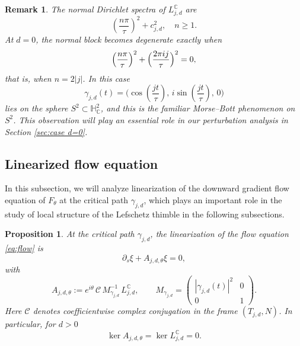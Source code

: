 \documentclass[11pt]{amsart}
\theoremstyle{plain}
\newtheorem{prop}[thm]{Proposition}
\newtheorem{rmk}[thm]{Remark}
\theoremstyle{definition}
\newcommand{\C}{\mathbb{C}}
\newcommand{\HH}{\mathbb{H}}
\begin{document}
\begin{rmk}
The normal Dirichlet spectra of $L_{j,d}^{\C}$ are
\[\left(\frac{n\pi}{\tau}\right)^2+c_{j,d}^2,\quad n\ge1.\]
At $d=0$, the normal block becomes degenerate exactly when
\[
\Bigl(\frac{n\pi}{\tau}\Bigr)^2+\Bigl(\frac{2\pi ij}{\tau}\Bigr)^2=0,
\]
that is, when $n=2|j|$. In this case 
$$
\gamma_{j,d}(t)=\bigl(\cos(\frac{jt}{\tau}),\,i \sin(\frac{jt}{\tau}),\,0\bigr)
$$
lies on the sphere $S^2\subset \HH_{\C}^2$, and this is the familiar Morse--Bott phenomenon on $S^2$. This observation will play an essential role in our perturbation analysis in Section \ref{sec:case d=0}. 
\end{rmk}





\subsection{Linearized flow equation}

In this subsection, we will analyze linearization of the downward gradient flow equation of $F_{\theta}$ at the critical path $\gamma_{j,d}$, which plays an important role in the study of local structure of the Lefschetz thimble in the following subsections. 

\begin{prop}\label{prop:linearization}
At the critical path $\gamma_{j,d}$, the linearization of the flow equation \eqref{eq:flow} is
\begin{equation}\label{eq:linflow}
\partial_s \xi + A_{j,d,\theta}\xi=0,
\end{equation}
with
\[
A_{j,d,\theta}:=e^{i\theta}\,\mathcal{C}\,M_{\gamma_{j,d}}^{-1}\,L_{j,d}^{\C},\qquad M_{\gamma_{j,d}}=\begin{pmatrix}
    |\gamma_{j,d}(t)|^2  & 0\\
    0 & 1
\end{pmatrix}.\]
Here $\mathcal C$ denotes coefficientwise complex conjugation in the frame $(T_{j,d},N)$. In particular, for $d>0$
\[
\ker A_{j,d,\theta}=\ker L_{j,d}^{\C}=0.
\]
\end{prop}
\end{document}
